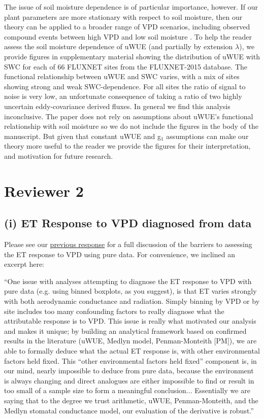 \documentclass[12pt]{article}
\begin{document}
The issue of soil moisture dependence is of particular importance,
however. If our plant parameters are more stationary with respect to
soil moisture, then our theory can be applied to a broader range of
VPD scenarios, including observed compound events between high VPD and
low soil moisture \citep{Zhou_2019}. To help the reader assess the
soil moisture dependence of uWUE (and partially by extension
$\lambda$), we provide figures in supplementary material showing the
distribution of uWUE with SWC for each of 66 FLUXNET sites from the
FLUXNET-2015 database. The functional relationship between uWUE and
SWC varies, with a mix of sites showing strong and weak
SWC-dependence. For all sites the ratio of signal to noise is very
low, an unfortunate consequence of taking a ratio of two highly
uncertain eddy-covariance derived fluxes. In general we find this
analysis inconclusive. The paper does not rely on assumptions about
uWUE's functional relationship with soil moisture so we do not include
the figures in the body of the manuscript. But given that constant
uWUE and g$_1$ assumptions can make our theory more useful to the
reader we provide the figures for their interpretation, and motivation
for future research.


\section{Reviewer 2}
\subsection{(i)  ET Response to VPD diagnosed from data}
\label{(i)}
Please see our
\href{https://www.hydrol-earth-syst-sci-discuss.net/hess-2018-553/hess-2018-553-AC2-supplement.pdf}{previous
  response} for a full discussion of the barriers to assessing the ET
response to VPD using pure data. For convenience, we inclined an excerpt
here:

\medskip

``One issue with analyses attempting to diagnose the ET response to
VPD with pure data (e.g. using binned boxplots, as you suggest), is
that ET varies strongly with both aerodynamic conductance and
radiation. Simply binning by VPD or by site includes too many
confounding factors to really diagnose what the attributable response
is to VPD. This issue is really what motivated our analysis and makes
it unique; by building an analytical framework based on confirmed
results in the literature (uWUE, Medlyn model, Penman-Monteith [PM]),
we are able to formally deduce what the actual ET response is, with
other environmental factors held fixed. This ``other environmental
factors held fixed'' component is, in our mind, nearly impossible to
deduce from pure data, because the environment is always changing and
direct analogues are either impossible to find or result in too small
of a sample size to form a meaningful conclusion... Essentially we are
saying that to the degree we trust arithmetic, uWUE, Penman-Monteith,
and the Medlyn stomatal conductance model, our evaluation of the
derivative is robust.''
\end{document}
